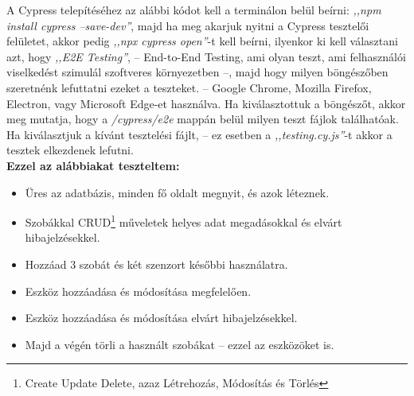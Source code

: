 \documentclass[
]{thesis-ekf}
\theoremstyle{definition}
\theoremstyle{remark}
\begin{document}
	A Cypress telepítéséhez az alábbi kódot kell a terminálon belül beírni: \emph{,,npm install cypress --save-dev''}, majd ha meg akarjuk nyitni a Cypress tesztelői felületet, akkor pedig \emph{,,npx cypress open''}-t kell beírni, ilyenkor ki kell választani azt, hogy \emph{,,E2E Testing''}, -- End-to-End Testing, ami olyan teszt, ami felhasználói viselkedést szimulál szoftveres környezetben --, majd hogy milyen böngészőben szeretnénk lefuttatni ezeket a teszteket. -- Google Chrome, Mozilla Firefox, Electron, vagy Microsoft Edge-et használva. Ha kiválasztottuk a böngészőt, akkor meg mutatja, hogy a \emph{/cypress/e2e} mappán belül milyen teszt fájlok találhatóak. Ha kiválasztjuk a kívánt tesztelési fájlt, -- ez esetben a \emph{,,testing.cy.js''}-t akkor a tesztek elkezdenek lefutni.\\
	\textbf{Ezzel az alábbiakat teszteltem:}
	\begin{itemize}
		\item Üres az adatbázis, minden fő oldalt megnyit, és azok léteznek.
		\item Szobákkal CRUD\footnote{Create Update Delete, azaz Létrehozás, Módosítás és Törlés} műveletek helyes adat megadásokkal és elvárt hibajelzésekkel.
		\item Hozzáad 3 szobát és két szenzort későbbi használatra.
		\item Eszköz hozzáadása és módosítása megfelelően.
		\item Eszköz hozzáadása és módosítása elvárt hibajelzésekkel.
		\item Majd a végén törli a használt szobákat -- ezzel az eszközöket is.
	\end{itemize}
\end{document}
